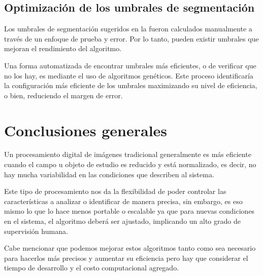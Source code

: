 \subsection{Optimización de los umbrales de segmentación}
Los umbrales de segmentación sugeridos en la  fueron calculados manualmente a través de un enfoque de prueba y error. Por lo tanto, pueden existir umbrales que mejoran el rendimiento del algoritmo.

Una forma automatizada de encontrar umbrales más eficientes, o de verificar que no los hay, es mediante el uso de algoritmos genéticos. Este proceso identificaría la configuración más eficiente de los umbrales maximizando su nivel de eficiencia, o bien, reduciendo el margen de error.

\section{Conclusiones generales}
Un procesamiento digital de imágenes tradicional generalmente es más eficiente cuando el campo u objeto de estudio es reducido y está normalizado, es decir, no hay mucha variabilidad en las condiciones que describen al sistema.

Este tipo de procesamiento nos da la flexibilidad de poder controlar las características a analizar o identificar de manera precisa, sin embargo, es eso mismo lo que lo hace menos portable o escalable ya que para nuevas condiciones en el sistema, el algoritmo deberá ser ajustado, implicando un alto grado de supervisión humana.

Cabe mencionar que podemos mejorar estos algoritmos tanto como sea necesario para hacerlos más precisos y aumentar su eficiencia pero hay que considerar el tiempo de desarrollo y el costo computacional agregado.